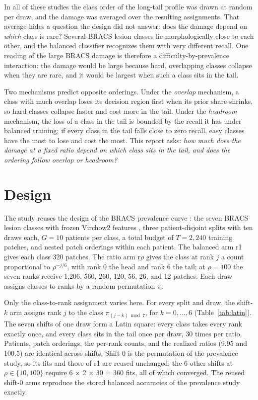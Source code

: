 \documentclass[11pt]{article}
\begin{document}
In all of these studies the class order of the long-tail profile was drawn at random per draw, and the damage was averaged over the resulting assignments. That average hides a question the design did not answer: does the damage depend on \emph{which} class is rare? Several BRACS lesion classes lie morphologically close to each other, and the balanced classifier recognizes them with very different recall. One reading of the large BRACS damage is therefore a difficulty-by-prevalence interaction: the damage would be large because hard, overlapping classes collapse when they are rare, and it would be largest when such a class sits in the tail.

Two mechanisms predict opposite orderings. Under the \emph{overlap} mechanism, a class with much overlap loses its decision region first when its prior share shrinks, so hard classes collapse faster and cost more in the tail. Under the \emph{headroom} mechanism, the loss of a class in the tail is bounded by the recall it has under balanced training; if every class in the tail falls close to zero recall, easy classes have the most to lose and cost the most. This report asks: \emph{how much does the damage at a fixed ratio depend on which class sits in the tail, and does the ordering follow overlap or headroom?}

\section{Design}
\label{sec:design}
The study reuses the design of the BRACS prevalence curve \citep{queisler2026prevalenceBracs}: the seven BRACS lesion classes with frozen Virchow2 features \citep{zimmermann2024virchow2}, three patient-disjoint splits with ten draws each, $G=10$ patients per class, a total budget of $T=2{,}240$ training patches, and nested patch orderings within each patient. The balanced arm r1 gives each class 320 patches. The ratio arm r$\rho$ gives the class at rank $j$ a count proportional to $\rho^{-j/6}$, with rank 0 the head and rank 6 the tail; at $\rho=100$ the seven ranks receive 1,206, 560, 260, 120, 56, 26, and 12 patches. Each draw assigns classes to ranks by a random permutation $\pi$.

Only the class-to-rank assignment varies here. For every split and draw, the shift-$k$ arm assigns rank $j$ to the class $\pi_{(j-k)\bmod 7}$, for $k=0,\dots,6$ (Table~\ref{tab:latin}). The seven shifts of one draw form a Latin square: every class takes every rank exactly once, and every class sits in the tail once per draw, 30 times per ratio. Patients, patch orderings, the per-rank counts, and the realized ratios (9.95 and 100.5) are identical across shifts. Shift 0 is the permutation of the prevalence study, so its fits and those of r1 are reused unchanged; the 6 other shifts at $\rho\in\{10,100\}$ require 6 $\times$ 2 $\times$ 30 = 360 fits, all of which converged. The reused shift-0 arms reproduce the stored balanced accuracies of the prevalence study exactly.
\end{document}

